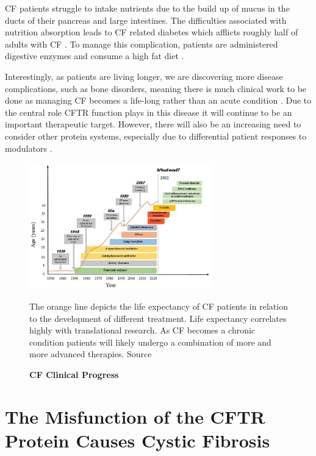 CF patients struggle to intake nutrients due to the build up of mucus in the ducts of their pancreas and large intestines. The difficulties associated with nutrition absorption leads to CF related diabetes which afflicts roughly half of adults with CF \cite{Kayani2018}. To manage this complication, patients are administered digestive enzymes and consume a high fat diet \cite{sullivan2017}. 

Interestingly, as patients are living longer, we are discovering more disease complications, such as bone disorders, meaning there is much clinical work to be done as managing CF becomes a life-long rather than an acute condition \cite{stalvey2013}. Due to the central role CFTR function plays in this disease it will continue to be an important therapeutic target. However, there will also be an increasing need to consider other protein systems, especially due to differential patient responses to modulators \cite{hanafin2021, robertson2015, lingam2017, seelig2020, barbieri2021a, grebert2019}. 

\begin{figure}
	\label{CF_life_expectancy}
	\begin{center}
	\includegraphics[width=0.7\textwidth]{figures/CF_life_expectancy.png}
	\end{center}
	\captionsetup{singlelinecheck = false, justification=raggedright}
	\caption[CF Clinical Progress] {\textbf{CF Clinical Progress}}{The orange line depicts the life expectancy of CF patients in relation to the development of different treatment. Life expectancy correlates highly with translational research. As CF becomes a chronic condition patients will likely undergo a combination of more and more advanced therapies. Source \cite{garcia2022}} 
\end{figure}


\section{The Misfunction of the CFTR Protein Causes Cystic Fibrosis}

